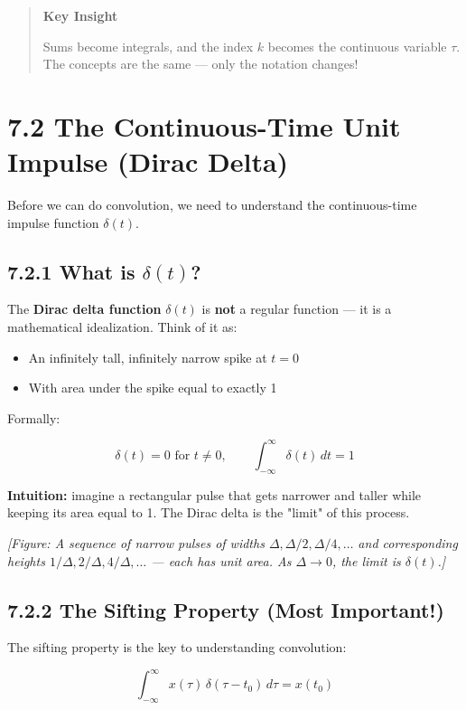 \documentclass[11pt]{article}
\begin{document}
\begin{quote}
\textbf{Key Insight}

Sums become integrals, and the index $k$ becomes the continuous variable $\tau$. The concepts are the same — only the notation changes!
\end{quote}

\section*{7.2 The Continuous-Time Unit Impulse (Dirac Delta)}

Before we can do convolution, we need to understand the continuous-time impulse function $\delta(t)$.

\subsection*{7.2.1 What is $\delta(t)$?}

The \textbf{Dirac delta function} $\delta(t)$ is \textbf{not} a regular function — it is a mathematical idealization. Think of it as:

\begin{itemize}
  \item An infinitely tall, infinitely narrow spike at $t=0$
  \item With area under the spike equal to exactly 1
\end{itemize}

Formally:

\[\delta(t) = 0 \text{ for } t \neq 0, \qquad \int_{-\infty}^{\infty} \delta(t)\,dt = 1\]

\textbf{Intuition:} imagine a rectangular pulse that gets narrower and taller while keeping its area equal to 1. The Dirac delta is the "limit" of this process.

\textit{[Figure: A sequence of narrow pulses of widths $\Delta, \Delta/2, \Delta/4, \ldots$ and corresponding heights $1/\Delta, 2/\Delta, 4/\Delta, \ldots$ — each has unit area. As $\Delta \to 0$, the limit is $\delta(t)$.]}

\subsection*{7.2.2 The Sifting Property (Most Important!)}

The sifting property is the key to understanding convolution:

\[\boxed{\;\int_{-\infty}^{\infty} x(\tau)\,\delta(\tau - t_0)\,d\tau = x(t_0)\;}\]
\end{document}
